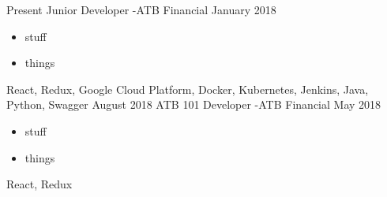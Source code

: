 
\begin{experiences}
  \experience
    {Present}   {Junior Developer -}{ATB Financial}{}
    {January 2018} {
                      \begin{itemize}
                        \item stuff
                        \item things
                      \end{itemize}
                    }
                    {
                        React,
                        Redux,
                        Google Cloud Platform,
                        Docker,
                        Kubernetes,
                        Jenkins,
                        Java,
                        Python,
                        Swagger
                    }
  \emptySeparator
  \experience
  {August 2018}   {ATB 101 Developer -}{ATB Financial}{}
  {May 2018} {
                    \begin{itemize}
                      \item stuff
                      \item things
                    \end{itemize}
                  }
                  {
                      React,
                      Redux
                  }
\end{experiences}